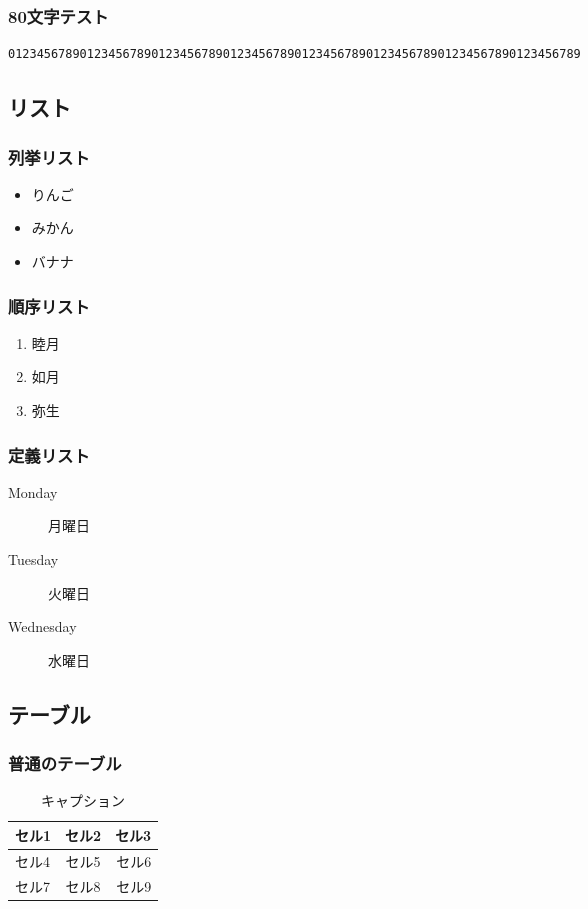 \subsubsection{80文字テスト}
\begin{lstlisting}
01234567890123456789012345678901234567890123456789012345678901234567890123456789
\end{lstlisting}

\subsection{リスト}

\subsubsection{列挙リスト}
\begin{itemize}
\item りんご
\item みかん
\item バナナ
\end{itemize}

\subsubsection{順序リスト}
\begin{enumerate}
\item 睦月
\item 如月
\item 弥生
\end{enumerate}

\subsubsection{定義リスト}
\begin{description}
\item[Monday] 月曜日
\item[Tuesday] 火曜日
\item[Wednesday] 水曜日
\end{description}

\subsection{テーブル}

\subsubsection{普通のテーブル}
\begin{table}[htbp]
\begin{center}
\begin{tabular}{|l|c|r|}
\hline
セル1 & セル2 & セル3 \\ \hline
セル4 & セル5 & セル6 \\ \hline
セル7 & セル8 & セル9 \\ \hline
\end{tabular}
\caption{キャプション}
\end{center}
\end{table}

